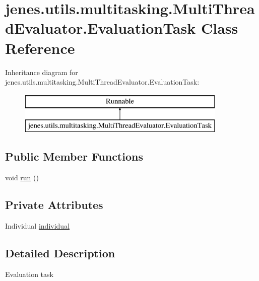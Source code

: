 \hypertarget{classjenes_1_1utils_1_1multitasking_1_1_multi_thread_evaluator_1_1_evaluation_task}{\section{jenes.\-utils.\-multitasking.\-Multi\-Thread\-Evaluator.\-Evaluation\-Task Class Reference}
\label{classjenes_1_1utils_1_1multitasking_1_1_multi_thread_evaluator_1_1_evaluation_task}
}
Inheritance diagram for jenes.\-utils.\-multitasking.\-Multi\-Thread\-Evaluator.\-Evaluation\-Task\-:\begin{figure}[H]
\begin{center}
\leavevmode
\includegraphics[height=2.000000cm]{classjenes_1_1utils_1_1multitasking_1_1_multi_thread_evaluator_1_1_evaluation_task}
\end{center}
\end{figure}
\subsection*{Public Member Functions}
\begin{DoxyCompactItemize}
\item 
void \hyperlink{classjenes_1_1utils_1_1multitasking_1_1_multi_thread_evaluator_1_1_evaluation_task_a88665b17a100d380914fb397908293e0}{run} ()
\end{DoxyCompactItemize}
\subsection*{Private Attributes}
\begin{DoxyCompactItemize}
\item 
Individual \hyperlink{classjenes_1_1utils_1_1multitasking_1_1_multi_thread_evaluator_1_1_evaluation_task_a1f962ae5b9065ffffe7978d69e91fdbe}{individual}
\end{DoxyCompactItemize}


\subsection{Detailed Description}
Evaluation task 

